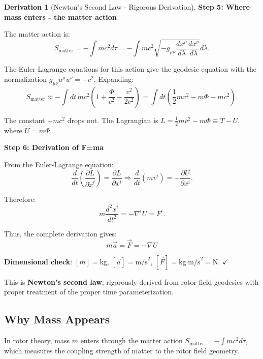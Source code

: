 \documentclass[12pt,a4paper]{article}
\theoremstyle{definition}
\newtheorem{derivation}{Derivation}[section]
\theoremstyle{remark}
\begin{document}
\begin{derivation}[Newton's Second Law - Rigorous Derivation]
\textbf{Step 5: Where mass enters - the matter action}

The matter action is:
\begin{equation}
S_{\text{matter}} = -\int m c^2 d\tau = -\int m c^2 \sqrt{-g_{\mu\nu} \frac{dx^\mu}{d\lambda} \frac{dx^\nu}{d\lambda}} d\lambda.
\end{equation}

The Euler-Lagrange equations for this action give the geodesic equation with the normalization $g_{\mu\nu} u^\mu u^\nu = -c^2$. Expanding:
\begin{equation}
S_{\text{matter}} \approx -\int dt \, m c^2 \left(1 + \frac{\Phi}{c^2} - \frac{v^2}{2c^2}\right) = \int dt \left(\frac{1}{2}mv^2 - m\Phi - mc^2\right).
\end{equation}

The constant $-mc^2$ drops out. The Lagrangian is $L = \frac{1}{2}mv^2 - m\Phi \equiv T - U$, where $U = m\Phi$.

\textbf{Step 6: Derivation of F=ma}

From the Euler-Lagrange equation:
\begin{equation}
\frac{d}{dt}\left(\frac{\partial L}{\partial \dot{x}^i}\right) = \frac{\partial L}{\partial x^i} \Rightarrow \frac{d}{dt}(m v^i) = -\frac{\partial U}{\partial x^i}.
\end{equation}

Therefore:
\begin{equation}
m \frac{d^2 x^i}{dt^2} = -\nabla^i U = F^i.
\end{equation}
\end{derivation}

Thus, the complete derivation gives:
\begin{equation}
\boxed{m\vec{a} = \vec{F} = -\nabla U}
\end{equation}

\textbf{Dimensional check}: $[m] = \text{kg}$, $[\vec{a}] = \text{m/s}^2$, $[\vec{F}] = \text{kg·m/s}^2 = \text{N}$. $\checkmark$

This is \textbf{Newton's second law}, rigorously derived from rotor field geodesics with proper treatment of the proper time parameterization.

\subsection{Why Mass Appears}

In rotor theory, mass $m$ enters through the matter action $S_{\text{matter}} = -\int m c^2 d\tau$, which measures the coupling strength of matter to the rotor field geometry.
\end{document}
